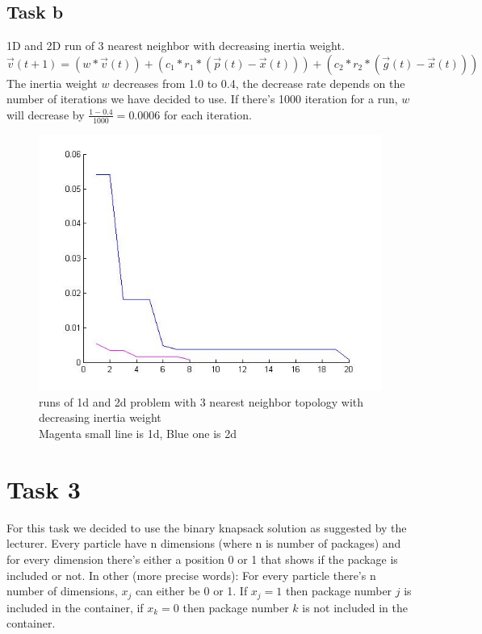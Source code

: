 \documentclass[12pt, a4paper]{article}
\begin{document}
\subsection{Task b}
1D and 2D run of 3 nearest neighbor with decreasing inertia weight.
$\vec{v}(t+1)=(w*\vec{v}(t))+(c_1*r_1*(\vec{p}(t)-\vec{x}(t))) +(c_2*r_2*(\vec{g}(t)-\vec{x}(t)))$\\
The inertia weight $w$ decreases from 1.0 to 0.4, the decrease rate depends on the number of iterations we have decided to use. If there's 1000 iteration for a run, $w$ will decrease by $\frac{1-0.4}{1000} = 0.0006
$ for each iteration.
\begin{figure}[H]
\begin{center}
\includegraphics[width=\linewidth]{3nn_with_inertia}
\caption{runs of 1d and 2d problem with 3 nearest neighbor topology with decreasing inertia weight\\
Magenta small line is 1d, Blue one is 2d}
\end{center}

\end{figure}
\section{Task 3}\label{3}
For this task we decided to use the binary knapsack solution as suggested by the lecturer. Every particle have n dimensions (where n is number of packages) and for every dimension there's either a position 0 or 1 that shows if the package is included or not.
In other (more precise words):
For every particle there's n number of dimensions, $x_j$ can either be 0 or 1.
If $x_j = 1$ then package number $j$ is included in the container, if $x_k = 0$ then package number $k$ is not included in the container.
\end{document}
